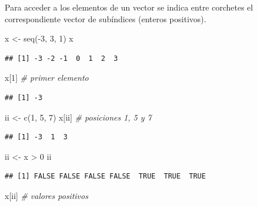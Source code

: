 \documentclass[
]{book}
\newenvironment{Shaded}{\begin{snugshade}}{\end{snugshade}}
\newcommand{\CommentTok}[1]{\textcolor[rgb]{0.56,0.35,0.01}{\textit{#1}}}
\newcommand{\DecValTok}[1]{\textcolor[rgb]{0.00,0.00,0.81}{#1}}
\newcommand{\FunctionTok}[1]{\textcolor[rgb]{0.00,0.00,0.00}{#1}}
\newcommand{\NormalTok}[1]{#1}
\newcommand{\OtherTok}[1]{\textcolor[rgb]{0.56,0.35,0.01}{#1}}
\newcommand{\SpecialCharTok}[1]{\textcolor[rgb]{0.00,0.00,0.00}{#1}}
\theoremstyle{break}
\theoremstyle{nonumberplain}
\begin{document}
Para acceder a los elementos de un vector se indica entre corchetes el
correspondiente vector de subíndices (enteros positivos).

\begin{Shaded}
\begin{Highlighting}[]
\NormalTok{x }\OtherTok{\textless{}{-}} \FunctionTok{seq}\NormalTok{(}\SpecialCharTok{{-}}\DecValTok{3}\NormalTok{, }\DecValTok{3}\NormalTok{, }\DecValTok{1}\NormalTok{)}
\NormalTok{x}
\end{Highlighting}
\end{Shaded}

\begin{verbatim}
## [1] -3 -2 -1  0  1  2  3
\end{verbatim}

\begin{Shaded}
\begin{Highlighting}[]
\NormalTok{x[}\DecValTok{1}\NormalTok{]  }\CommentTok{\# primer elemento}
\end{Highlighting}
\end{Shaded}

\begin{verbatim}
## [1] -3
\end{verbatim}

\begin{Shaded}
\begin{Highlighting}[]
\NormalTok{ii }\OtherTok{\textless{}{-}} \FunctionTok{c}\NormalTok{(}\DecValTok{1}\NormalTok{, }\DecValTok{5}\NormalTok{, }\DecValTok{7}\NormalTok{)}
\NormalTok{x[ii] }\CommentTok{\# posiciones 1, 5 y 7}
\end{Highlighting}
\end{Shaded}

\begin{verbatim}
## [1] -3  1  3
\end{verbatim}

\begin{Shaded}
\begin{Highlighting}[]
\NormalTok{ii }\OtherTok{\textless{}{-}}\NormalTok{ x }\SpecialCharTok{\textgreater{}} \DecValTok{0}
\NormalTok{ii}
\end{Highlighting}
\end{Shaded}

\begin{verbatim}
## [1] FALSE FALSE FALSE FALSE  TRUE  TRUE  TRUE
\end{verbatim}

\begin{Shaded}
\begin{Highlighting}[]
\NormalTok{x[ii]  }\CommentTok{\# valores positivos}
\end{Highlighting}
\end{Shaded}
\end{document}
